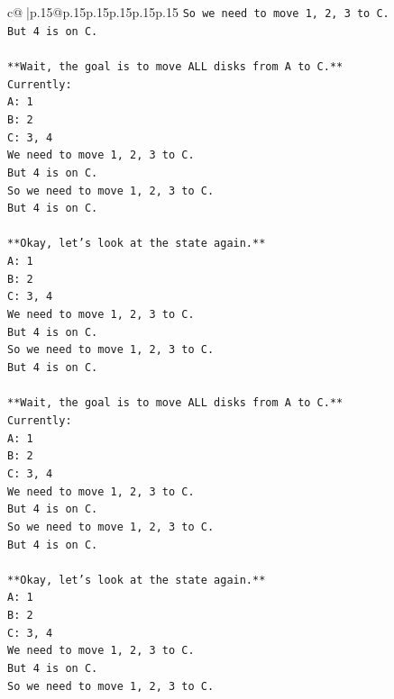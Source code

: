 \documentclass{article}
\begin{document}
{\begin{supertabular}{c@{$\;$}|p{.15\linewidth}@{}p{.15\linewidth}p{.15\linewidth}p{.15\linewidth}p{.15\linewidth}p{.15\linewidth}}
{{{\texttt{So we need to move 1, 2, 3 to C.} \\
\texttt{But 4 is on C.} \\
\\ 
\texttt{**Wait, the goal is to move ALL disks from A to C.**} \\
\texttt{Currently:} \\
\texttt{A: 1} \\
\texttt{B: 2} \\
\texttt{C: 3, 4} \\
\texttt{We need to move 1, 2, 3 to C.} \\
\texttt{But 4 is on C.} \\
\texttt{So we need to move 1, 2, 3 to C.} \\
\texttt{But 4 is on C.} \\
\\ 
\texttt{**Okay, let's look at the state again.**} \\
\texttt{A: 1} \\
\texttt{B: 2} \\
\texttt{C: 3, 4} \\
\texttt{We need to move 1, 2, 3 to C.} \\
\texttt{But 4 is on C.} \\
\texttt{So we need to move 1, 2, 3 to C.} \\
\texttt{But 4 is on C.} \\
\\ 
\texttt{**Wait, the goal is to move ALL disks from A to C.**} \\
\texttt{Currently:} \\
\texttt{A: 1} \\
\texttt{B: 2} \\
\texttt{C: 3, 4} \\
\texttt{We need to move 1, 2, 3 to C.} \\
\texttt{But 4 is on C.} \\
\texttt{So we need to move 1, 2, 3 to C.} \\
\texttt{But 4 is on C.} \\
\\ 
\texttt{**Okay, let's look at the state again.**} \\
\texttt{A: 1} \\
\texttt{B: 2} \\
\texttt{C: 3, 4} \\
\texttt{We need to move 1, 2, 3 to C.} \\
\texttt{But 4 is on C.} \\
\texttt{So we need to move 1, 2, 3 to C.} \\
}}}
\end{supertabular}}
\end{document}
